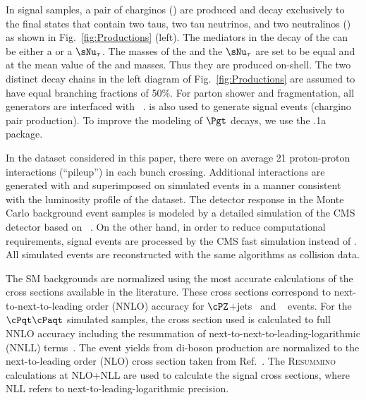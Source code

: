 In signal samples, a pair of charginos (\chione) 
are produced and decay exclusively to the final states that contain two taus, two tau neutrinos, and %
two neutralinos (\PSGczDo) as shown in Fig.~\ref{fig:Productions} (left). 
The mediators in the decay of the \chione can be either a \sTau or a $\sNu_{\tau}$. 
The masses of the \sTau and the $\sNu_{\tau}$ are set to be equal and at the mean value of the \chione and \PSGczDo masses. 
Thus they are produced on-shell.
The two distinct decay chains in the left diagram of Fig.~\ref{fig:Productions} 
are assumed to have equal branching fractions of 50\%. 
For parton shower and fragmentation, all generators are interfaced with ~\cite{Sjostrand:2006za}.
\PYTHIA is also used to generate signal events (chargino pair production). To improve the modeling of $\Pgt$ decays, 
we use the .1a~\cite{Davidson:2010rw} package. 


In the dataset considered in this paper,
there were on average 21 proton-proton interactions (``pileup'') in each bunch crossing.
Additional interactions are generated with \PYTHIA and superimposed on simulated events in a manner consistent with the
luminosity profile of the dataset.
The detector response in the Monte Carlo background event samples is modeled by a
detailed simulation
of the CMS detector based on {\GEANTfour}~\cite{Agostinelli:2002hh}.  
On the other hand, in order to reduce  computational requirements, signal events 
are processed by the CMS fast simulation \cite{Abdullin:2011zz} instead of {\GEANTfour}. 
All simulated events are reconstructed with the same algorithms as collision data.

The SM backgrounds are normalized using the most accurate calculations of the cross sections available 
in the literature. These cross sections correspond to next-to-next-to-leading order (NNLO) accuracy for $\cPZ$+jets~\cite{Melnikov:2006kv} 
and \wjets~\cite{xsec_WZ} events. For the $\cPqt\cPaqt$ simulated samples, the cross section used is calculated to full NNLO accuracy including
the resummation of next-to-next-to-leading-logarithmic (NNLL) terms~\cite{Czakon:2011xx}. %
The event yields from di-boson production are normalized to the next-to-leading order (NLO) cross section  taken from Ref.~\cite{Campbell:2011bn}. 
The \textsc{Resummino}~\cite{Fuks:2012qx,Fuks:2013vua,Fuks:2013lya} calculations at NLO+NLL are used to calculate the signal cross sections, where 
NLL refers to next-to-leading-logarithmic precision.
